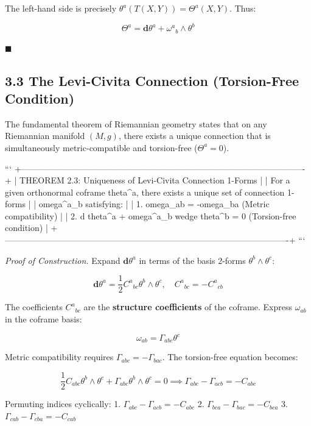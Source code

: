 \documentclass[11pt,twoside,openright]{amsbook}
\begin{document}
{{{{{{The left-hand side is precisely $\theta^a(T(X, Y)) = \Theta^a(X, Y)$. Thus:

$$\Theta^a = \mathbf{d}\theta^a + \omega^a{}_b \wedge \theta^b$$

$\blacksquare$

\subsection{3.3 The Levi-Civita Connection (Torsion-Free Condition)}

The fundamental theorem of Riemannian geometry states that on any Riemannian manifold $(M, g)$, there exists a unique connection that is simultaneously metric-compatible and torsion-free ($\Theta^a = 0$).

```
+----------------------------------------------------------------------------------------------------+
| THEOREM 2.3: Uniqueness of Levi-Civita Connection 1-Forms                                          |
| For a given orthonormal coframe {theta^a}, there exists a unique set of connection 1-forms         |
| omega^a{}_b satisfying:                                                                            |
| 1. omega_{ab} = -omega_{ba} (Metric compatibility)                                                 |
| 2. d theta^a + omega^a{}_b wedge theta^b = 0 (Torsion-free condition)                               |
+----------------------------------------------------------------------------------------------------+
```

\textit{Proof of Construction.} Expand $\mathbf{d}\theta^a$ in terms of the basis 2-forms $\theta^b \wedge \theta^c$:

$$\mathbf{d}\theta^a = \frac{1}{2} C^a{}_{bc} \theta^b \wedge \theta^c, \quad C^a{}_{bc} = -C^a{}_{cb}$$

The coefficients $C^a{}_{bc}$ are the \textbf{structure coefficients} of the coframe. Express $\omega_{ab}$ in the coframe basis:

$$\omega_{ab} = \Gamma_{abc} \theta^c$$

Metric compatibility requires $\Gamma_{abc} = -\Gamma_{bac}$. The torsion-free equation becomes:

$$\frac{1}{2} C_{abc} \theta^b \wedge \theta^c + \Gamma_{abc} \theta^b \wedge \theta^c = 0 \implies \Gamma_{abc} - \Gamma_{acb} = -C_{abc}$$

Permuting indices cyclically:
1. $\Gamma_{abc} - \Gamma_{acb} = -C_{abc}$
2. $\Gamma_{bca} - \Gamma_{bac} = -C_{bca}$
3. $\Gamma_{cab} - \Gamma_{cba} = -C_{cab}$

}}}}}}
\end{document}
